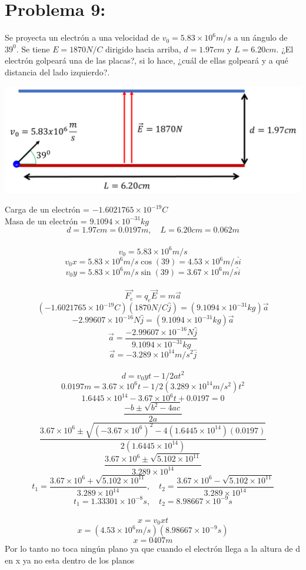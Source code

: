 \documentclass[12pt]{article}
\begin{document}
		\section{Problema 9:}\label{sec:Problema9}
			Se proyecta un electrón a una velocidad de $ v_0 = 5.83 \times 10^6 m/s $ a un ángulo de $ 39^0 $.
			Se tiene $ E = 1870N/C $ dirigido hacia arriba, $ d = 1.97cm $ y $ L = 6.20cm $. ¿El electrón
			golpeará una de las placas?, si lo hace, ¿cuál de ellas golpeará y a qué distancia
			del lado izquierdo?.
			\begin{center}
				\includegraphics[width=.6\linewidth]{Imp9t1.png} 
			\end{center}
			Carga de un electrón = $ -1.6021765 \times 10^{-19}C $\\
			Masa de un electrón = $ 9.1094 \times 10^{-31} kg $
			$$ d = 1.97cm = 0.0197m, \quad L = 6.20cm = 0.062m $$ \\
			$$ v_0 = 5.83 \times 10^6m/s $$
			$$ v_0x = 5.83 \times 10^6m/s \cos(39) = 4.53 \times 10^6m/s \hat{i} $$
			$$ v_0y = 5.83 \times 10^6m/s \sin(39) = 3.67 \times 10^6m/s \hat{i} $$ \\
			$$ \vec{F_e} = q_e \vec{E} = m \vec{a} $$
			$$ (-1.6021765 \times 10^{-19}C)(1870N/C \hat{j}) = (9.1094 \times 10^{-31}kg) \vec{a}$$
			$$ -2.99607 \times 10^{-16}N \hat{j} = (9.1094 \times 10^{-31}kg) \vec{a} $$
			$$ \vec{a} = \frac{-2.99607 \times 10^{-16}N \hat{j}}{9.1094 \times 10^{-31}kg} $$
			$$ \vec{a} = -3.289 \times 10^{14} m/s^2 \hat{j} $$ \\

			$$ d = v_0yt -1/2at^2 $$
			$$ 0.0197m = 3.67 \times 10^6t - 1/2(3.289 \times 10^{14} m/s^2)t^2 $$
			$$ 1.6445 \times 10^{14} - 3.67 \times 10^6t + 0.0197 = 0  $$
			$$ \frac{-b \pm \sqrt{b^2-4ac}}{2a} $$
			$$ \frac{3.67 \times 10^6 \pm \sqrt{(- 3.67 \times 10^6)^2 - 4(1.6445 \times 10^{14})(0.0197)}}{2(1.6445 \times 10^{14})} $$
			$$ \frac{3.67 \times 10^6 \pm \sqrt{5.102 \times 10^{11}}}{3.289 \times 10^{14}} $$
			$$ t_1 = \frac{3.67 \times 10^6 + \sqrt{5.102 \times 10^{11}}}{3.289 \times 10^{14}} , \quad 
			t_2 = \frac{3.67 \times 10^6 - \sqrt{5.102 \times 10^{11}}}{3.289 \times 10^{14}} $$
			$$ t_1 = 1.33301 \times 10^{-8}s, \quad t_2 = 8.98667 \times 10^{-9}s $$ \\
			$$ x = v_0xt $$
			$$ x = (4.53 \times 10^{6}m/s)(8.98667 \times 10^{-9}s) $$
			$$ x = 0407m $$
			Por lo tanto no toca ningún plano ya que cuando el electrón llega a la altura de d en x ya no esta dentro de los planos
\end{document}
